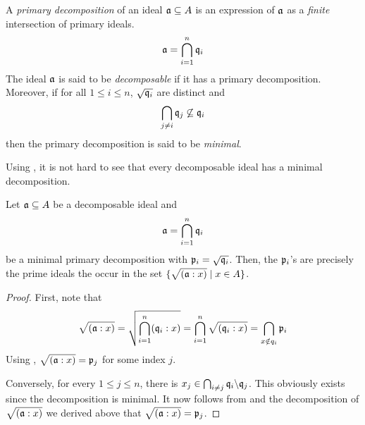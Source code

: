 \begin{definition}
    A \textit{primary decomposition} of an ideal $\mathfrak a\subseteq A$ is an expression of $\mathfrak a$ as a \textit{finite} intersection of primary ideals.
    \begin{equation*}
        \mathfrak a = \bigcap_{i = 1}^n\mathfrak q_i
    \end{equation*}
    The ideal $\mathfrak a$ is said to be \textit{decomposable} if it has a primary decomposition. Moreover, if for all $1\le i\le n$, $\sqrt{\mathfrak q_i}$ are distinct and 
    \begin{equation*}
        \bigcap_{j\ne i}\mathfrak q_j\not\subseteq\mathfrak q_i
    \end{equation*}
    then the primary decomposition is said to be \textit{minimal}.
\end{definition}

Using , it is not hard to see that every decomposable ideal has a minimal decomposition.

\begin{theorem}
    Let $\mathfrak a\subseteq A$ be a decomposable ideal and 
    \begin{equation*}
        \mathfrak a = \bigcap_{i = 1}^n\mathfrak q_i
    \end{equation*}
    be a minimal primary decomposition with $\mathfrak p_i = \sqrt{\mathfrak q_i}$. Then, the $\mathfrak p_i$'s are precisely the prime ideals the occur in the set $\{\sqrt{(\mathfrak a: x)}\mid x\in A\}$.
\end{theorem}
\begin{proof}
    First, note that 
    \begin{equation*}
        \sqrt{(\mathfrak a: x)} = \sqrt{\bigcap_{i = 1}^n(\mathfrak q_i: x)} = \bigcap_{i = 1}^n\sqrt{(\mathfrak q_i: x)} = \bigcap_{x\notin q_i}\mathfrak p_i
    \end{equation*}
    Using , $\sqrt{(\mathfrak a : x)} = \mathfrak p_j$ for some index $j$. 

    Conversely, for every $1\le j\le n$, there is $x_j\in\bigcap_{i\ne j}\mathfrak q_i\backslash\mathfrak q_j$. This obviously exists since the decomposition is minimal. It now follows from  and the decomposition of $\sqrt{(\mathfrak a: x)}$ we derived above that $\sqrt{(\mathfrak a : x)} = \mathfrak p_j$.
\end{proof}

